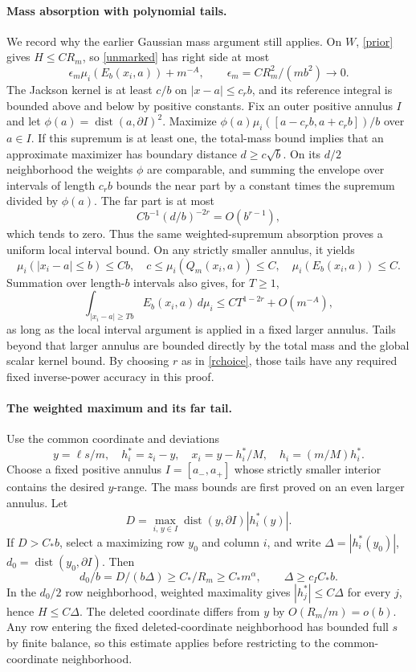 \documentclass[11pt]{article}
\begin{document}
\paragraph{Mass absorption with polynomial tails.}
We record why the earlier Gaussian mass argument still applies.
On $W$, \eqref{prior} gives $H\le CR_m$, so \eqref{unmarked}
has right side at most
\[
 \epsilon_m\mu_i(E_b(x_i,a))+m^{-A},\qquad
 \epsilon_m=CR_m^2/(mb^2)\longrightarrow0.
\]
The Jackson kernel is at least $c/b$ on $|x-a|\le c_r b$, and its
reference integral is bounded above and below by positive constants.
Fix an outer positive annulus $I$ and let
$\phi(a)=\operatorname{dist}(a,\partial I)^2$.
Maximize $\phi(a)\mu_i([a-c_r b,a+c_r b])/b$ over $a\in I$.
If this supremum is at least one, the total-mass bound implies that
an approximate maximizer has boundary distance $d\ge c\sqrt b$.
On its $d/2$ neighborhood the weights $\phi$ are comparable, and
summing the envelope over intervals of length $c_r b$ bounds the
near part by a constant times the supremum divided by $\phi(a)$.
The far part is at most
\[
 Cb^{-1}(d/b)^{-2r}=O(b^{r-1}),
\]
which tends to zero. Thus the same weighted-supremum absorption
proves a uniform local interval bound. On any strictly smaller
annulus, it yields
\begin{equation}\label{mass}
 \mu_i(|x_i-a|\le b)\le Cb,\quad
 c\le\mu_i(Q_m(x_i,a))\le C,\quad \mu_i(E_b(x_i,a))\le C.
\end{equation}
Summation over length-$b$ intervals also gives, for $T\ge1$,
\begin{equation}\label{polytail}
 \int_{|x_i-a|\ge Tb}E_b(x_i,a)\,d\mu_i
       \le C T^{1-2r}+O(m^{-A}),
\end{equation}
as long as the local interval argument is applied in a fixed larger
annulus. Tails beyond that larger annulus are bounded directly by
the total mass and the global scalar kernel bound. By choosing
$r$ as in \eqref{rchoice}, those tails have any required fixed
inverse-power accuracy in this proof.

\paragraph{The weighted maximum and its far tail.}
Use the common coordinate and deviations
\[
 y=\ell s/m,\quad h_i^*=z_i-y,\quad
 x_i=y-h_i^*/M,\quad h_i=(m/M)h_i^*.
\]
Choose a fixed positive annulus $I=[a_-,a_+]$ whose strictly smaller
interior contains the desired $y$-range. The mass bounds are first
proved on an even larger annulus. Let
\[
 D=\max_{i,\,y\in I}\operatorname{dist}(y,\partial I)|h_i^*(y)|.
\]
If $D>C_*b$, select a maximizing row $y_0$ and column $i$, and write
$\Delta=|h_i^*(y_0)|$, $d_0=\operatorname{dist}(y_0,\partial I)$.
Then
\[
 d_0/b=D/(b\Delta)\ge C_*/R_m\ge C_*m^\alpha,
 \qquad \Delta\ge c_I C_*b.
\]
In the $d_0/2$ row neighborhood, weighted maximality gives
$|h_j^*|\le C\Delta$ for every $j$, hence $H\le C\Delta$.
The deleted coordinate differs from $y$ by $O(R_m/m)=o(b)$.
Any row entering the fixed deleted-coordinate neighborhood has
bounded full $s$ by finite balance, so this estimate applies before
restricting to the common-coordinate neighborhood.
\end{document}
